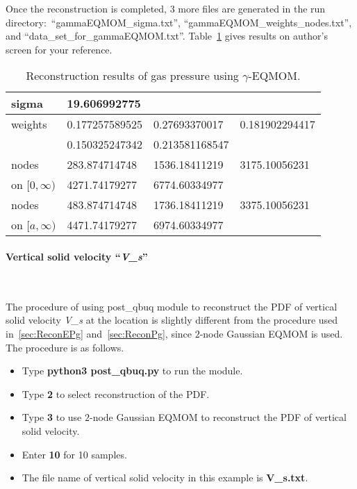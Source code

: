 \documentclass[a4paper,12pt,titlepage]{article}
\begin{document}
Once the reconstruction is completed, 3 more files are generated in the run
directory:\ ``gammaEQMOM\_sigma.txt'', ``gammaEQMOM\_weights\_nodes.txt'', and
``data\_set\_for\_gammaEQMOM.txt''. Table~\ref{tab:ReconPg} gives results on 
author's screen for your reference.

\begin{table}[htp]
 \centering
 \begin{tabular}{l|lll} \hline
  sigma            & \multicolumn{3}{l}{19.606992775}                 \\ \hline
  weights          & 0.177257589525 & 0.27693370017  & 0.181902294417 \\ 
                   & 0.150325247342 & 0.213581168547 &                \\ \hline
  nodes            & 283.874714748  & 1536.18411219  & 3175.10056231  \\
  on $[0, \infty)$ & 4271.74179277  & 6774.60334977  &                \\ \hline
  nodes            & 483.874714748  & 1736.18411219  & 3375.10056231  \\ 
  on $[a, \infty)$ & 4471.74179277  & 6974.60334977  &                \\ \hline
 \end{tabular}
 \caption{Reconstruction results of gas pressure using $\gamma$-EQMOM.}
 \label{tab:ReconPg}
\end{table}

\paragraph{Vertical solid velocity ``\emph{V\_s}''}\mbox{}\\
\label{sec:ReconVs}

The procedure of using post\_qbuq module to reconstruct the PDF of vertical
solid velocity \emph{V\_s} at the location is slightly different from the 
procedure used in~\ref{sec:ReconEPg} and~\ref{sec:ReconPg}, since $2$-node
Gaussian EQMOM is used\cite{Chalons2010}. The procedure is as follows.

\begin{itemize}
 \item Type \textbf{python3 post\_qbuq.py} to run the module.
 \item Type \textbf{2} to select reconstruction of the PDF.
 \item Type \textbf{3} to use $2$-node Gaussian EQMOM to reconstruct the PDF of 
 vertical solid velocity.
 \item Enter \textbf{10} for 10 samples.
 \item The file name of vertical solid velocity in this example is 
 \textbf{V\_s.txt}.
\end{itemize}
\end{document}
